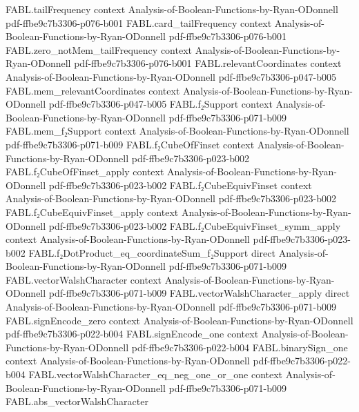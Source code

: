\begin{theorem}
\proofstep
  {FABL.tailFrequency}
  {context}
  {Analysis-of-Boolean-Functions-by-Ryan-ODonnell}
  {pdf-ffbe9c7b3306-p076-b001}
\proofstep
  {FABL.card_tailFrequency}
  {context}
  {Analysis-of-Boolean-Functions-by-Ryan-ODonnell}
  {pdf-ffbe9c7b3306-p076-b001}
\proofstep
  {FABL.zero_notMem_tailFrequency}
  {context}
  {Analysis-of-Boolean-Functions-by-Ryan-ODonnell}
  {pdf-ffbe9c7b3306-p076-b001}
\proofstep
  {FABL.relevantCoordinates}
  {context}
  {Analysis-of-Boolean-Functions-by-Ryan-ODonnell}
  {pdf-ffbe9c7b3306-p047-b005}
\proofstep
  {FABL.mem_relevantCoordinates}
  {context}
  {Analysis-of-Boolean-Functions-by-Ryan-ODonnell}
  {pdf-ffbe9c7b3306-p047-b005}
\proofstep
  {FABL.f₂Support}
  {context}
  {Analysis-of-Boolean-Functions-by-Ryan-ODonnell}
  {pdf-ffbe9c7b3306-p071-b009}
\proofstep
  {FABL.mem_f₂Support}
  {context}
  {Analysis-of-Boolean-Functions-by-Ryan-ODonnell}
  {pdf-ffbe9c7b3306-p071-b009}
\proofstep
  {FABL.f₂CubeOfFinset}
  {context}
  {Analysis-of-Boolean-Functions-by-Ryan-ODonnell}
  {pdf-ffbe9c7b3306-p023-b002}
\proofstep
  {FABL.f₂CubeOfFinset_apply}
  {context}
  {Analysis-of-Boolean-Functions-by-Ryan-ODonnell}
  {pdf-ffbe9c7b3306-p023-b002}
\proofstep
  {FABL.f₂CubeEquivFinset}
  {context}
  {Analysis-of-Boolean-Functions-by-Ryan-ODonnell}
  {pdf-ffbe9c7b3306-p023-b002}
\proofstep
  {FABL.f₂CubeEquivFinset_apply}
  {context}
  {Analysis-of-Boolean-Functions-by-Ryan-ODonnell}
  {pdf-ffbe9c7b3306-p023-b002}
\proofstep
  {FABL.f₂CubeEquivFinset_symm_apply}
  {context}
  {Analysis-of-Boolean-Functions-by-Ryan-ODonnell}
  {pdf-ffbe9c7b3306-p023-b002}
\proofstep
  {FABL.f₂DotProduct_eq_coordinateSum_f₂Support}
  {direct}
  {Analysis-of-Boolean-Functions-by-Ryan-ODonnell}
  {pdf-ffbe9c7b3306-p071-b009}
\proofstep
  {FABL.vectorWalshCharacter}
  {context}
  {Analysis-of-Boolean-Functions-by-Ryan-ODonnell}
  {pdf-ffbe9c7b3306-p071-b009}
\proofstep
  {FABL.vectorWalshCharacter_apply}
  {direct}
  {Analysis-of-Boolean-Functions-by-Ryan-ODonnell}
  {pdf-ffbe9c7b3306-p071-b009}
\proofstep
  {FABL.signEncode_zero}
  {context}
  {Analysis-of-Boolean-Functions-by-Ryan-ODonnell}
  {pdf-ffbe9c7b3306-p022-b004}
\proofstep
  {FABL.signEncode_one}
  {context}
  {Analysis-of-Boolean-Functions-by-Ryan-ODonnell}
  {pdf-ffbe9c7b3306-p022-b004}
\proofstep
  {FABL.binarySign_one}
  {context}
  {Analysis-of-Boolean-Functions-by-Ryan-ODonnell}
  {pdf-ffbe9c7b3306-p022-b004}
\proofstep
  {FABL.vectorWalshCharacter_eq_neg_one_or_one}
  {context}
  {Analysis-of-Boolean-Functions-by-Ryan-ODonnell}
  {pdf-ffbe9c7b3306-p071-b009}
\proofstep
  {FABL.abs_vectorWalshCharacter}

\end{theorem}
